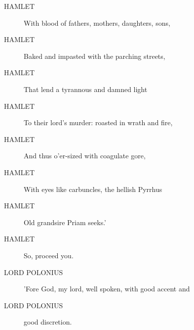 \documentclass{article}
\begin{document}
\begin{description}
\item[HAMLET] With blood of fathers, mothers, daughters, sons,
\item[HAMLET] Baked and impasted with the parching streets,
\item[HAMLET] That lend a tyrannous and damned light
\item[HAMLET] To their lord's murder: roasted in wrath and fire,
\item[HAMLET] And thus o'er-sized with coagulate gore,
\item[HAMLET] With eyes like carbuncles, the hellish Pyrrhus
\item[HAMLET] Old grandsire Priam seeks.'
\item[HAMLET] So, proceed you.
\end{description}
          
\begin{description}
            
\item[LORD POLONIUS] 'Fore God, my lord, well spoken, with good accent and
\item[LORD POLONIUS] good discretion.
\end{description}
          
\end{document}
